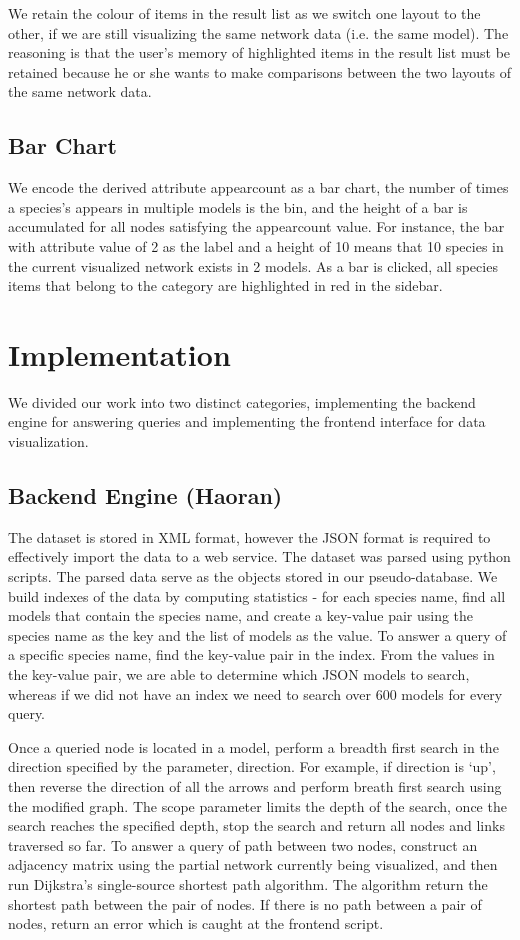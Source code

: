 \documentclass[journal]{vgtc}                %
\begin{document}
We retain the colour of items in the result list as we switch one layout to the other, if we are still visualizing the same network data (i.e. the same model). The reasoning is that the user’s memory of highlighted items in the result list must be retained because he or she wants to make comparisons between the two layouts of the same network data. 

\subsection{Bar Chart}
We encode the derived attribute appear\textunderscore count as a bar chart, the number of times a species’s appears in multiple models is the bin, and the height of a bar is accumulated for all nodes satisfying the appear\textunderscore count value. For instance, the bar with attribute value of 2 as the label and a height of 10 means that 10 species in the current visualized network exists in 2 models. As a bar is clicked, all species items that belong to the category are highlighted in red in the sidebar.



\section{Implementation}


We divided our work into two distinct categories, implementing the backend engine for answering queries and implementing the frontend interface for data visualization.

\subsection{Backend Engine (Haoran)}
The dataset is stored in XML format, however the JSON format is required to effectively import the data to a web service. The dataset was parsed using python scripts. The parsed data serve as the objects stored in our pseudo-database. We build indexes of the data by computing statistics - for each species name, find all models that contain the species name, and create a key-value pair using the species name as the key and the list of models as the value. To answer a query of a specific species name, find the key-value pair in the index. From the values in the key-value pair, we are able to determine which JSON models to search, whereas if we did not have an index we need to search over 600 models for every query.

Once a queried node is located in a model, perform a breadth first search in the direction specified by the parameter, direction. For example, if direction is ‘up’, then reverse the direction of all the arrows and perform breath first search using the modified graph. The scope parameter limits the depth of the search, once the search reaches the specified depth, stop the search and return all nodes and links traversed so far. To answer a query of path between two nodes, construct an adjacency matrix using the partial network currently being visualized, and then run Dijkstra’s single-source shortest path algorithm. The algorithm return the shortest path between the pair of nodes. If there is no path between a pair of nodes, return an error which is caught at the frontend script. 
\end{document}
